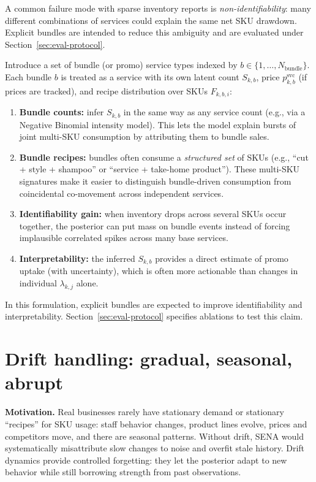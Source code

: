 \documentclass[11pt]{article}
\begin{document}
A common failure mode with sparse inventory reports is \emph{non-identifiability}: many different combinations of services could explain the same net SKU drawdown.
Explicit bundles are intended to reduce this ambiguity and are evaluated under Section~\ref{sec:eval-protocol}.

Introduce a set of bundle (or promo) service types indexed by $b\in\{1,\dots,N_{\mathrm{bundle}}\}$.
Each bundle $b$ is treated as a service with its own latent count $S_{k,b}$, price $p^{\mathrm{svc}}_{k,b}$ (if prices are tracked), and recipe distribution over SKUs $F_{k,b,i}$:
\begin{enumerate}
  \item \textbf{Bundle counts:} infer $S_{k,b}$ in the same way as any service count (e.g., via a Negative Binomial intensity model). This lets the model explain bursts of joint multi-SKU consumption by attributing them to bundle sales.

  \item \textbf{Bundle recipes:} bundles often consume a \emph{structured set} of SKUs (e.g., ``cut + style + shampoo'' or ``service + take-home product''). These multi-SKU signatures make it easier to distinguish bundle-driven consumption from coincidental co-movement across independent services.

  \item \textbf{Identifiability gain:} when inventory drops across several SKUs occur together, the posterior can put mass on bundle events instead of forcing implausible correlated spikes across many base services.

  \item \textbf{Interpretability:} the inferred $S_{k,b}$ provides a direct estimate of promo uptake (with uncertainty), which is often more actionable than changes in individual $\lambda_{k,j}$ alone.
\end{enumerate}

In this formulation, explicit bundles are expected to improve identifiability and interpretability.
Section~\ref{sec:eval-protocol} specifies ablations to test this claim.

\section{Drift handling: gradual, seasonal, abrupt}\label{sec:drift-handling}

\textbf{Motivation.} Real businesses rarely have stationary demand or stationary ``recipes'' for SKU usage: staff behavior changes, product lines evolve, prices and competitors move, and there are seasonal patterns.
Without drift, SENA would systematically misattribute slow changes to noise and overfit stale history.
Drift dynamics provide controlled forgetting: they let the posterior adapt to new behavior while still borrowing strength from past observations.
\end{document}
